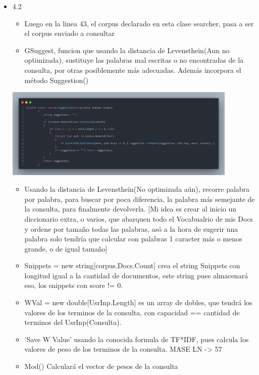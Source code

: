 \documentclass{article}
\begin{document}
\begin{enumerate}
\begin{itemize}
            \item 4.2
                \begin{itemize}
                    \item Luego en la linea 43, el corpus declarado en esta clase searcher, pasa a ser el corpus enviado a consultar
                    \item GSuggest, funcion que usando la distancia de Levensthein(Aun no optimizada), sustituye las palabras mal escritas o no encontradas de la consulta, por otras posiblemente más adecuadas. Además incorpora el método Suggestion() 
                    
                \end{itemize}
            \includegraphics[width=420px]{Assets/Suggestion.png}
                
            \newpage
            \begin{itemize}
                \item Usando la distancia de Levensthein(No optimizada aún), recorre palabra por palabra, para buscar por poca diferencia, la palabra más semejante de la consulta, para finalmente devolverla. [Mi idea es crear al inicio un diccionario extra, o varios, que abarquen todo el Vocabualrio de mis Docs y ordene por tamaño todas las palabras, asó a la hora de sugerir una palabra solo tendría que calcular con palabras 1 caracter más o menos grande, o de igual tamaño]
                \item Snippets = new string[corpus.Docs.Count] crea el string Snippets con longitud igual a la cantidad de documentos, este string pues almacenará eso, los snippets con score != 0.
                \item WVal = new double[UsrInp.Length] es un array de dobles, que tendrá los valores de los terminos de la consulta, con capacidad == cantidad de terminos del UsrInp(Consulta).
                \item 'Save W Value' usando la conocida formula de TF*IDF, pues calcula los valores de peso de los terminos de la consulta. MASE LN -> 57
                \item Mod() Calculará el vector de pesos de la consulta
                

\end{itemize}
\end{itemize}
\end{enumerate}
\end{document}
